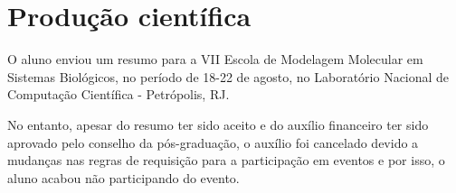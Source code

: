 \chapter{Produção científica}\label{ch:introducao}

O aluno enviou um resumo para a VII Escola de Modelagem Molecular em Sistemas Biológicos, no período de 18-22 de agosto, no Laboratório Nacional de Computação Científica - Petrópolis, RJ. 

No entanto, apesar do resumo ter sido aceito e do auxílio financeiro ter sido aprovado pelo conselho da pós-graduação, o auxílio foi cancelado devido a mudanças nas regras de requisição para a participação em eventos e por isso, o aluno acabou não participando do evento.
